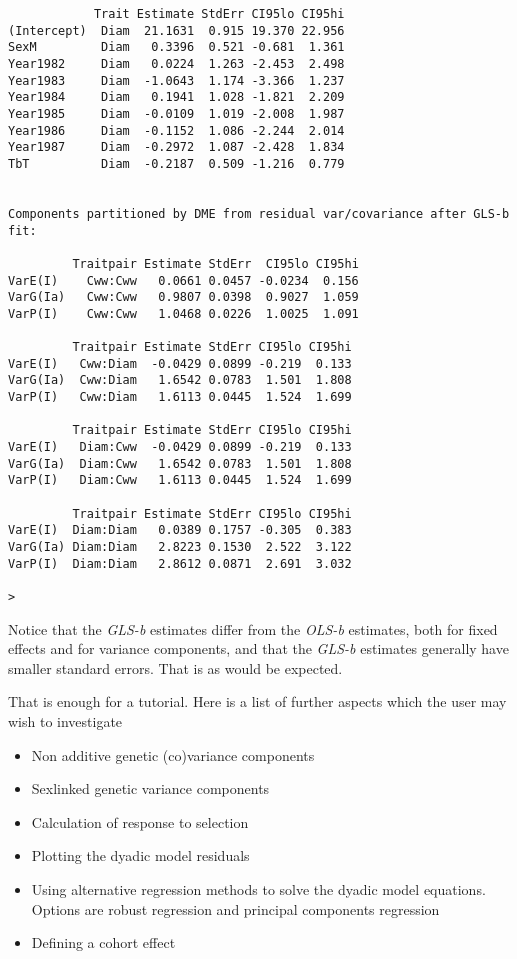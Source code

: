 \documentclass[titlepage]{article}  %
\begin{document}
\begin{verbatim}
            Trait Estimate StdErr CI95lo CI95hi
(Intercept)  Diam  21.1631  0.915 19.370 22.956
SexM         Diam   0.3396  0.521 -0.681  1.361
Year1982     Diam   0.0224  1.263 -2.453  2.498
Year1983     Diam  -1.0643  1.174 -3.366  1.237
Year1984     Diam   0.1941  1.028 -1.821  2.209
Year1985     Diam  -0.0109  1.019 -2.008  1.987
Year1986     Diam  -0.1152  1.086 -2.244  2.014
Year1987     Diam  -0.2972  1.087 -2.428  1.834
TbT          Diam  -0.2187  0.509 -1.216  0.779


Components partitioned by DME from residual var/covariance after GLS-b fit:

         Traitpair Estimate StdErr  CI95lo CI95hi
VarE(I)    Cww:Cww   0.0661 0.0457 -0.0234  0.156
VarG(Ia)   Cww:Cww   0.9807 0.0398  0.9027  1.059
VarP(I)    Cww:Cww   1.0468 0.0226  1.0025  1.091

         Traitpair Estimate StdErr CI95lo CI95hi
VarE(I)   Cww:Diam  -0.0429 0.0899 -0.219  0.133
VarG(Ia)  Cww:Diam   1.6542 0.0783  1.501  1.808
VarP(I)   Cww:Diam   1.6113 0.0445  1.524  1.699

         Traitpair Estimate StdErr CI95lo CI95hi
VarE(I)   Diam:Cww  -0.0429 0.0899 -0.219  0.133
VarG(Ia)  Diam:Cww   1.6542 0.0783  1.501  1.808
VarP(I)   Diam:Cww   1.6113 0.0445  1.524  1.699

         Traitpair Estimate StdErr CI95lo CI95hi
VarE(I)  Diam:Diam   0.0389 0.1757 -0.305  0.383
VarG(Ia) Diam:Diam   2.8223 0.1530  2.522  3.122
VarP(I)  Diam:Diam   2.8612 0.0871  2.691  3.032

> 
\end{verbatim}

Notice that the {\em GLS-b} estimates differ from the {\em OLS-b} estimates, both for fixed effects and for variance components, and that the {\em GLS-b} estimates generally have smaller standard errors. That is as would be expected. 

That is enough for a tutorial. Here is a list of further aspects which the user may wish to investigate

\begin{itemize}
\item Non additive genetic (co)variance components
\item Sexlinked genetic variance components
\item Calculation of response to selection
\item Plotting the dyadic model residuals
\item Using alternative regression methods to solve the dyadic model equations. Options are robust regression and principal components regression
\item Defining a cohort effect
\end{itemize}
\end{document}
